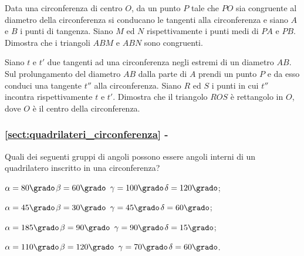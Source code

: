 \begin{multicols}{2}
\begin{esercizio}
\label{ese:5.39}
Data una circonferenza di centro \(O\), da un punto \(P\) tale che \(PO\) 
sia congruente al diametro della circonferenza si conducano le 
tangenti alla circonferenza e siano \(A\) e \(B\) i punti di tangenza. 
Siano \(M\) ed \(N\) rispettivamente i punti medi di \(PA\) e \(PB\). 
Dimostra che i triangoli \(ABM\) e \(ABN\) sono congruenti.
\end{esercizio}

\begin{esercizio}
\label{ese:5.40}
Siano \(t\) e \(t'\) due tangenti ad una circonferenza negli estremi di 
un diametro \(AB\). Sul prolungamento del diametro \(AB\) dalla parte di 
\(A\) prendi un punto \(P\) e da esso conduci una tangente \(t''\) alla 
circonferenza. Siano \(R\) ed \(S\) i punti in cui \(t''\) incontra 
rispettivamente \(t\) e \(t'\).  Dimostra che il triangolo \(ROS\) è 
rettangolo in \(O\), dove \(O\) è il centro della circonferenza.
\end{esercizio}

\end{multicols}

\begingroup
\hypersetup{linkcolor=black}
\subsubsection*{\ref{sect:quadrilateri_circonferenza} - 
}
\endgroup

\begin{esercizio}
\label{ese:5.41}
Quali dei seguenti gruppi di angoli possono essere angoli interni di 
un quadrilatero inscritto in una circonferenza?
\begin{enumeratea}
\item \(\alpha=80\grado\)\tab	\(\beta=60\grado\)\tab 
\(\gamma=100\grado\)\tab \(\delta=120\grado\);
\item \(\alpha=45\grado\)\tab	\(\beta=30\grado\)\tab 
\(\gamma=45\grado\)\tab \(\delta=60\grado\);
\item \(\alpha=185\grado\)\tab \(\beta=90\grado\)\tab 
\(\gamma=90\grado\)\tab \(\delta=15\grado\);
\item \(\alpha=110\grado\)\tab \(\beta=120\grado\)\tab 
\(\gamma=70\grado\)\tab \(\delta=60\grado\).
\end{enumeratea}
\end{esercizio}

